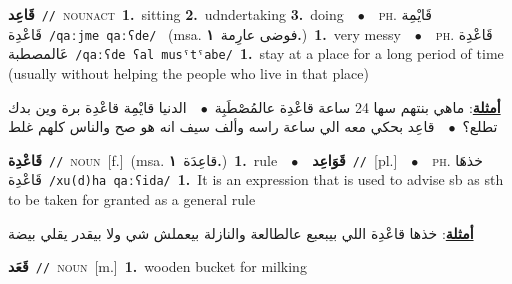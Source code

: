 \documentclass[10pt,a4paper,twoside]{article} %
\begin{document}
\begin{multicols}{2}
{\setlength\topsep{0pt}\textbf{\foreignlanguage{arabic}{قَاعِد}}\ {\color{gray}\texttt{//}\color{black}}\ \textsc{noun\textunderscore act}\ \textbf{1.}~sitting  \textbf{2.}~udndertaking  \textbf{3.}~doing\ \ $\bullet$\ \ \textsc{ph.} \color{gray} \foreignlanguage{arabic}{قَايْمِة قَاعْدِة}\color{black}\ {\color{gray}\texttt{/{\sffamily qaːjme qaːʕde}/}\color{black}}\ \color{gray} (msa. \foreignlanguage{arabic}{فوضى عارِمة}~\foreignlanguage{arabic}{\textbf{١.}})\color{black}\ \textbf{1.}~very messy\ \ $\bullet$\ \ \textsc{ph.} \color{gray} \foreignlanguage{arabic}{قَاعْدِة عَالمصطبة}\color{black}\ {\color{gray}\texttt{/{\sffamily qaːʕde ʕal musˤtˤabe}/}\color{black}}\ \textbf{1.}~stay at a place for a long period of time (usually without helping the people who live in that place)\  \begin{flushright}\color{gray}\foreignlanguage{arabic}{\textbf{\underline{\foreignlanguage{arabic}{أمثلة}}}: ماهي بنتهم سها 24 ساعة قاعْدِة عالمُصْطَبِة\ $\bullet$\ \  الدنيا قايْمِة قاعْدِة برة وين بدك تطلع؟\ $\bullet$\ \  قاعِد بحكي معه الي ساعة راسه وألف سيف انه هو صح والناس كلهم غلط}\end{flushright}\color{black}} \vspace{2mm}

{\setlength\topsep{0pt}\textbf{\foreignlanguage{arabic}{قَاعْدِة}}\ {\color{gray}\texttt{//}\color{black}}\ \textsc{noun}\ [f.]\ \color{gray}(msa. \foreignlanguage{arabic}{قاعِدَة}~\foreignlanguage{arabic}{\textbf{١.}})\color{black}\ \textbf{1.}~rule\ \ $\bullet$\ \ \setlength\topsep{0pt}\textbf{\foreignlanguage{arabic}{قَوَاعِد}}\ {\color{gray}\texttt{//}\color{black}}\ [pl.]\ \ $\bullet$\ \ \textsc{ph.} \color{gray} \foreignlanguage{arabic}{خذهَا قَاعْدِة}\color{black}\ {\color{gray}\texttt{/{\sffamily xu(d)ha qaːʕida}/}\color{black}}\ \textbf{1.}~It is an expression that is used to advise sb as sth to be taken for granted as a general rule\  \begin{flushright}\color{gray}\foreignlanguage{arabic}{\textbf{\underline{\foreignlanguage{arabic}{أمثلة}}}: خذها قاعْدِة اللي بيبعبع عالطالعة والنازلة بيعملش شي ولا بيقدر يقلي بيضة}\end{flushright}\color{black}} \vspace{2mm}

{\setlength\topsep{0pt}\textbf{\foreignlanguage{arabic}{قَعَد}}\ {\color{gray}\texttt{//}\color{black}}\ \textsc{noun}\ [m.]\ \textbf{1.}~wooden bucket for milking\ } \vspace{2mm}


\end{multicols}
\end{document}
